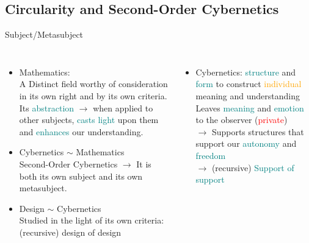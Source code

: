 \documentclass[
	11pt,
	aspectratio=169,
]{beamer}
\begin{document}
        \subsection{Circularity and Second-Order Cybernetics}
            \begin{frame}{Subject/Metasubject}
                \begin{columns}
                        \begin{itemize}
                            \item<1-> Mathematics:\\
                                A Distinct field worthy of consideration in its own right and by its own criteria.\\
                                Its \textcolor{teal}{abstraction} $\longrightarrow$ when applied to other subjects, \textcolor{teal}{casts light} upon them and \textcolor{teal}{enhances} our understanding.
                            \item<2-> Cybernetics $\sim$ Mathematics\\
                                Second-Order Cybernetics $\longrightarrow$ It is both its own subject and its own metasubject.
                            \item<3-> Design $\sim$ Cybernetics\\
                                Studied in the light of its own criteria:\\
                                (recursive) design of design
                        \end{itemize}
                        \begin{itemize}
                            \item<4-> Cybernetics: \textcolor{teal}{structure} and \textcolor{teal}{form} to construct \textcolor{orange}{individual} meaning and understanding\\
                                Leaves \textcolor{teal}{meaning} and \textcolor{teal}{emotion} to the observer (\textcolor{red}{private})\\
                                $\longrightarrow$ Supports structures that support our \textcolor{teal}{autonomy} and \textcolor{teal}{freedom}\\
                                $\longrightarrow$ (recursive) \textcolor{teal}{Support of support}
                        \end{itemize}
                \end{columns}
            \end{frame}
\end{document}
